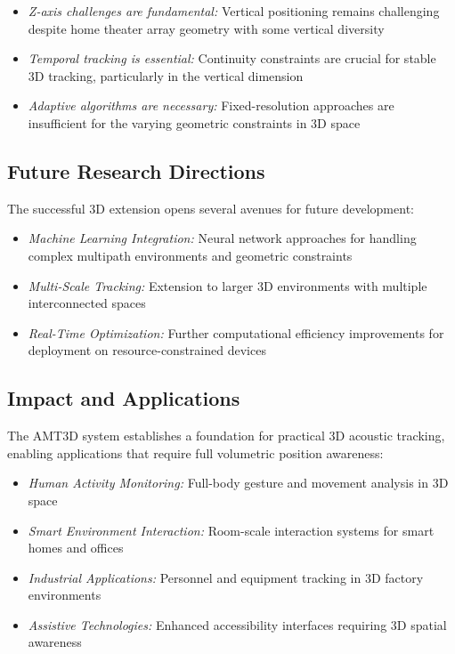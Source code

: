 \documentclass[a4paper]{article}
\begin{document}
\begin{itemize}
\item {\em Z-axis challenges are fundamental:} Vertical positioning remains challenging despite home theater array geometry with some vertical diversity
\item {\em Temporal tracking is essential:} Continuity constraints are crucial for stable 3D tracking, particularly in the vertical dimension
\item {\em Adaptive algorithms are necessary:} Fixed-resolution approaches are insufficient for the varying geometric constraints in 3D space
\end{itemize}

\subsection{Future Research Directions}

The successful 3D extension opens several avenues for future development:

\begin{itemize}
\item {\em Machine Learning Integration:} Neural network approaches for handling complex multipath environments and geometric constraints
\item {\em Multi-Scale Tracking:} Extension to larger 3D environments with multiple interconnected spaces
\item {\em Real-Time Optimization:} Further computational efficiency improvements for deployment on resource-constrained devices
\end{itemize}

\subsection{Impact and Applications}

The AMT3D system establishes a foundation for practical 3D acoustic tracking, enabling applications that require full volumetric position awareness:

\begin{itemize}
\item {\em Human Activity Monitoring:} Full-body gesture and movement analysis in 3D space
\item {\em Smart Environment Interaction:} Room-scale interaction systems for smart homes and offices
\item {\em Industrial Applications:} Personnel and equipment tracking in 3D factory environments
\item {\em Assistive Technologies:} Enhanced accessibility interfaces requiring 3D spatial awareness
\end{itemize}
\end{document}
